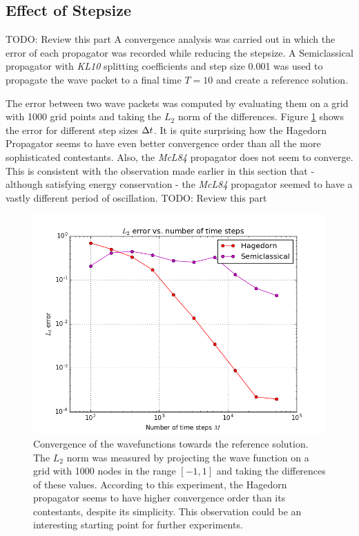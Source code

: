 \subsection{Effect of Stepsize}
\label{subsec:convergence}
{\Huge TODO: Review this part}
%
A convergence analysis was carried out in which the error of each propagator was recorded while reducing the stepsize.
A Semiclassical propagator with \emph{KL10} splitting coefficients and step size 0.001 was used to propagate the wave packet to a final time $T = 10$ and create a reference solution.
\par\medskip
%
The error between two wave packets was computed by evaluating them on a grid with 1000 grid points and taking the $L_2$ norm of the differences.
Figure \ref{fig:error_analysis} shows the error for different step sizes $\Delta t$.
It is quite surprising how the Hagedorn Propagator seems to have even better convergence order than all the more sophisticated contestants.
Also, the \emph{McL84} propagator does not seem to converge. This is consistent with the observation made earlier in this section that - although satisfying energy conservation - the \emph{McL84} propagator seemed to have a vastly different period of oscillation.
%
{\Huge TODO: Review this part}
%
\begin{figure}[ht]
	\centering
	\includegraphics[width=.8\textwidth]{figures/error_analysis.png}
	\caption{Convergence of the wavefunctions towards the reference solution. The $L_2$ norm was measured by projecting the wave function on a grid with 1000 nodes in the range $[-1,1]$ and taking the differences of these values. According to this experiment, the Hagedorn propagator seems to have higher convergence order than its contestants, despite its simplicity.
	This observation could be an interesting starting point for further experiments.}
	\label{fig:error_analysis}
\end{figure}

